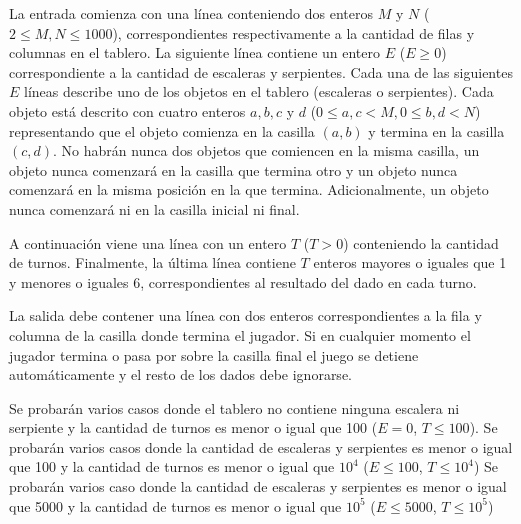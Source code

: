 \documentclass{oci}
\begin{document}
\begin{inputDescription}
  La entrada comienza con una línea conteniendo dos enteros $M$ y $N$ ($2 \leq
  M, N \leq 1000$), correspondientes respectivamente a la cantidad de filas y
  columnas en el tablero.
  La siguiente línea contiene un entero $E$ ($E \geq 0$) correspondiente a la
  cantidad de escaleras y serpientes.
  Cada una de las siguientes $E$ líneas describe uno de los objetos en el
  tablero (escaleras o serpientes).
  Cada objeto está descrito con cuatro enteros $a, b, c$ y $d$ ($0 \leq a, c
  < M, 0 \leq b, d < N$)
  representando que el objeto comienza en la casilla $(a, b)$ y termina en la
  casilla $(c, d)$.
  No habrán nunca dos objetos que comiencen en la misma casilla, un objeto
  nunca comenzará en la casilla que termina otro y un objeto nunca comenzará en
  la misma posición en la que termina.
  Adicionalmente, un objeto nunca comenzará ni en la casilla inicial ni final.

  A continuación viene una línea con un entero $T$ ($T > 0$) conteniendo la
  cantidad de turnos.
  Finalmente, la última línea contiene $T$ enteros mayores o iguales que 1 y
  menores o iguales 6, correspondientes al resultado del dado en cada turno.
\end{inputDescription}

\begin{outputDescription}
  La salida debe contener una línea con dos enteros correspondientes a la
  fila y columna de la casilla donde termina el jugador.
  Si en cualquier momento el jugador termina o pasa por sobre la casilla final
  el juego se detiene automáticamente y el resto de los dados debe ignorarse.
\end{outputDescription}

\begin{scoreDescription}
   Se probarán varios casos donde el tablero no contiene ninguna
  escalera ni serpiente y la cantidad de turnos es menor o igual que 100
  ($E = 0$, $T \leq 100$).
   Se probarán varios casos donde la cantidad de escaleras y
  serpientes es menor o igual que 100 y la cantidad de turnos es menor o igual
  que $10^4$ ($E \leq 100$, $T \leq 10^4$)
   Se probarán varios caso donde la cantidad de escaleras y serpientes
  es menor o igual que 5000 y la cantidad de turnos es menor o igual que $10^5$
  ($E \leq 5000$, $T \leq 10^5$)
\end{scoreDescription}

\begin{sampleDescription}
\end{sampleDescription}
\end{document}
